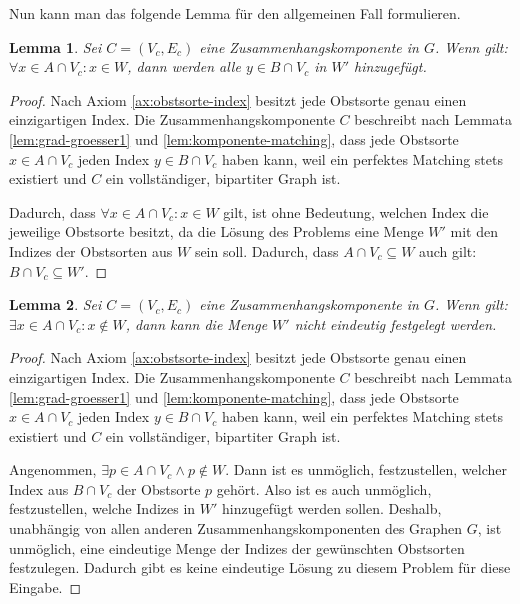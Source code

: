 \documentclass[a4paper,10pt,ngerman]{scrartcl}
\newtheorem{lemma}{Lemma}
\begin{document}
Nun kann man das folgende Lemma für den allgemeinen Fall formulieren. 



\begin{lemma}\label{}
Sei $C = (V_c, E_c)$ eine Zusammenhangskomponente in $G$.
Wenn gilt: $\forall x \in A \cap V_c : x \in W$, dann werden alle $y \in B \cap V_c$ in $W'$ hinzugefügt.
\end{lemma}
\begin{proof} 
Nach Axiom \ref{ax:obstsorte-index} besitzt jede Obstsorte genau einen einzigartigen Index.
Die Zusammenhangskomponente $C$ beschreibt nach Lemmata \ref{lem:grad-groesser1} und \ref{lem:komponente-matching},
dass jede Obstsorte $x \in A \cap V_c$ jeden Index $y \in B \cap V_c$ haben kann, weil
ein perfektes Matching stets existiert und $C$ ein vollständiger, bipartiter Graph ist.

Dadurch, dass $\forall x \in A \cap V_c : x \in W$ gilt,
ist ohne Bedeutung, welchen Index die jeweilige Obstsorte besitzt, da
 die Lösung des Problems eine Menge $W'$ mit den Indizes der Obstsorten aus $W$ sein soll.
Dadurch, dass $A \cap V_c \subseteq W$ auch gilt: $B \cap V_c \subseteq W'$. 
\end{proof}

\begin{lemma}
Sei $C = (V_c, E_c)$ eine Zusammenhangskomponente in $G$.
Wenn gilt: $\exists x \in A \cap V_c : x \notin W$, dann kann die Menge $W'$ nicht eindeutig
festgelegt werden.
\end{lemma}
\begin{proof}
Nach Axiom \ref{ax:obstsorte-index} besitzt jede Obstsorte genau einen einzigartigen Index.
Die Zusammenhangskomponente $C$ beschreibt nach Lemmata \ref{lem:grad-groesser1} und \ref{lem:komponente-matching},
dass jede Obstsorte $x \in A \cap V_c$ jeden Index $y \in B \cap V_c$ haben kann, weil
ein perfektes Matching stets existiert und $C$ ein vollständiger, bipartiter Graph ist.

Angenommen, $\exists p \in A \cap V_c \land p \notin W$. Dann ist es unmöglich, festzustellen,
welcher Index aus $B \cap V_c$ der Obstsorte $p$ gehört.
Also ist es auch unmöglich, festzustellen, welche Indizes in $W'$ hinzugefügt werden sollen.
Deshalb, unabhängig von allen anderen Zusammenhangskomponenten des Graphen $G$,
ist unmöglich, eine eindeutige Menge der Indizes der gewünschten Obstsorten festzulegen.
Dadurch gibt es keine eindeutige Lösung zu diesem Problem für diese Eingabe.
\end{proof}
\end{document}
